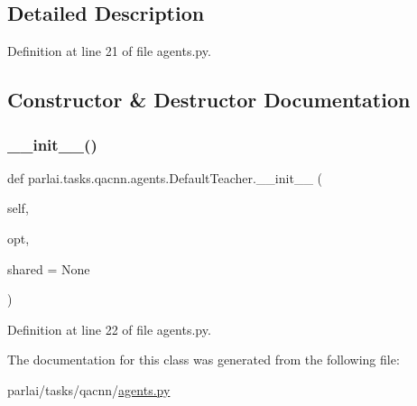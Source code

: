 \subsection{Detailed Description}


Definition at line 21 of file agents.\+py.



\subsection{Constructor \& Destructor Documentation}
\mbox{\label{classparlai_1_1tasks_1_1qacnn_1_1agents_1_1DefaultTeacher_a3b62aec4d32ee140251318598822f31c}} 
\subsubsection{\texorpdfstring{\+\_\+\+\_\+init\+\_\+\+\_\+()}{\_\_init\_\_()}}
{\footnotesize\ttfamily def parlai.\+tasks.\+qacnn.\+agents.\+Default\+Teacher.\+\_\+\+\_\+init\+\_\+\+\_\+ (\begin{DoxyParamCaption}\item[{}]{self,  }\item[{}]{opt,  }\item[{}]{shared = {\ttfamily None} }\end{DoxyParamCaption})}



Definition at line 22 of file agents.\+py.



The documentation for this class was generated from the following file\+:\begin{DoxyCompactItemize}
\item 
parlai/tasks/qacnn/\hyperlink{parlai_2tasks_2qacnn_2agents_8py}{agents.\+py}\end{DoxyCompactItemize}

